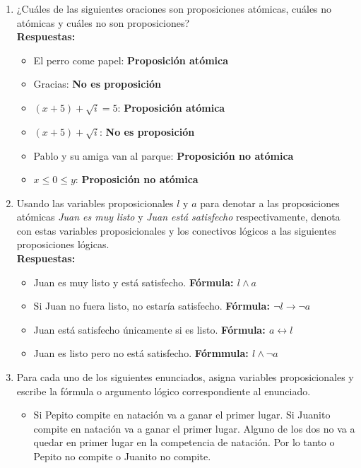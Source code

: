 \documentclass{article}
\begin{document}
\begin{enumerate}
	\item{¿Cuáles de las siguientes oraciones son proposiciones atómicas, cuáles no atómicas y cuáles no son proposiciones?}
		\\ \textbf{\large {Respuestas: }} \normalsize		
		\begin{itemize}
			\item{El perro come papel:} \textbf{Proposición atómica}
			\item{Gracias:} \textbf{No es proposición}
			\item{$(x + 5) + \sqrt{i} = 5 $:} \textbf{Proposición atómica}
			\item{$(x + 5) + \sqrt{i}$:} \textbf{No es proposición}
			\item{Pablo y su amiga van al parque:} \textbf{Proposición no atómica}
			\item{$x \leq 0 \leq y$:} \textbf{Proposición no atómica}
		\end{itemize}
	\item{Usando las variables proposicionales $l$ y $a$ para denotar a las proposiciones atómicas \emph{Juan es muy listo} y \emph{Juan está satisfecho} respectivamente, denota con estas variables proposicionales y los conectivos lógicos a las siguientes proposiciones lógicas.}
		\\ \textbf{\large {Respuestas: }} \normalsize	
		\begin{itemize}
			\item{Juan es muy listo y está satisfecho.} \textbf{ Fórmula: $l \wedge a$}
			\item{Si Juan no fuera listo, no estaría satisfecho.} \textbf{ Fórmula: $\neg l \rightarrow \neg a$}
			\item{Juan está satisfecho únicamente si es listo.} \textbf{Fórmula: $a \leftrightarrow l$}
			\item{Juan es listo pero no está satisfecho.} \textbf{Fórmmula: $l \wedge \neg a$}
		\end{itemize}
	\item{Para cada uno de los siguientes enunciados, asigna variables proposicionales y escribe la fórmula o argumento lógico correspondiente al enunciado.}
		\begin{itemize}
			\item Si Pepito compite en natación va a ganar el primer lugar. Si Juanito compite en natación va a ganar el primer lugar. Alguno de los dos no va a quedar en primer lugar en la competencia de natación. Por lo tanto o Pepito no compite o Juanito no compite.\\
		

\end{itemize}
\end{enumerate}
\end{document}
